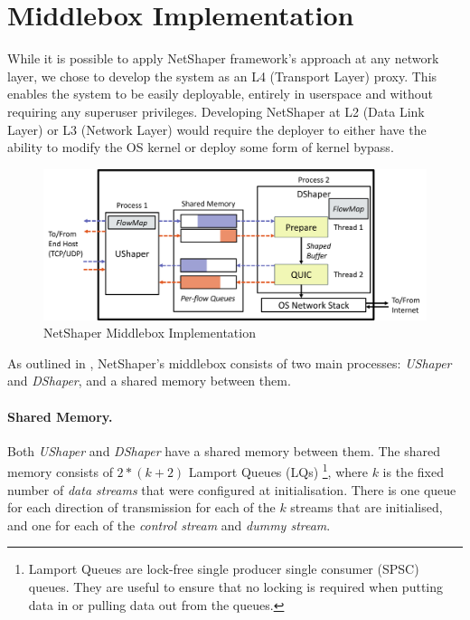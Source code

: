 \section{Middlebox Implementation}
\label{sec:netshaper-middlebox-implementation}

While it is possible to apply NetShaper framework's approach at any network layer, we chose to develop the system as an L4 (Transport Layer) proxy.
This enables the system to be easily deployable, entirely in userspace and without requiring any superuser privileges. 
Developing NetShaper at L2 (Data Link Layer) or L3 (Network Layer) would require the deployer to either have the ability to modify the OS kernel or deploy some form of kernel bypass.

\begin{figure}[!htb]
    \centering
    \includegraphics[width=\columnwidth]{figures/netshaper/middlebox-implementation.png}
    \caption{NetShaper Middlebox Implementation}
    \label{fig:middlebox-implementation}
\end{figure}

As outlined in , NetShaper's middlebox consists of two main processes: \textit{UShaper} and \textit{DShaper}, and a shared memory between them.

\paragraph{Shared Memory.}
Both \textit{UShaper} and \textit{DShaper} have a shared memory between them.
The shared memory consists of $2*(k + 2)$ Lamport Queues (LQs) \cite{lamportqueue}
\footnote{Lamport Queues are lock-free single producer single consumer (SPSC) queues. They are useful to ensure that no locking is required when putting data in or pulling data out from the queues.}, 
where $k$ is the fixed number of \textit{data streams} that were configured at initialisation.
There is one queue for each direction of transmission for each of the $k$ streams that are initialised, and one for each of the \textit{control stream} and \textit{dummy stream}.

